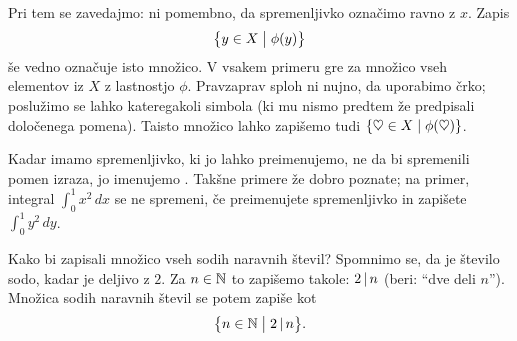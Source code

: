 Pri tem se zavedajmo: ni pomembno, da spremenljivko označimo ravno z $x$. Zapis
\[\set[1]{y \in X}{\phi(y)}\]
še vedno označuje isto množico. V vsakem primeru gre za množico vseh elementov iz $X$ z lastnostjo $\phi$. Pravzaprav sploh ni nujno, da uporabimo črko; poslužimo se lahko kateregakoli simbola (ki mu nismo predtem že predpisali določenega pomena). Taisto množico lahko zapišemo tudi $\set{\heartsuit \in X}{\phi(\heartsuit)}$.

Kadar imamo spremenljivko, ki jo lahko preimenujemo, ne da bi spremenili pomen izraza, jo imenujemo . Takšne primere že dobro poznate; na primer, integral $\int_0^1 x^2 \,dx$ se ne spremeni, če preimenujete spremenljivko in zapišete $\int_0^1 y^2 \,dy$.

\begin{zgled}
Kako bi zapisali množico vseh sodih naravnih števil? Spomnimo se, da je število sodo, kadar je deljivo z $2$. Za $n \in \mathbb{N}$ to zapišemo takole: $2 \,|\, n$ (beri: ``dve deli $n$''). Množica sodih naravnih števil se potem zapiše kot
\[\set[1]{n \in \NN}{2 \divides n}.\]
\end{zgled}

